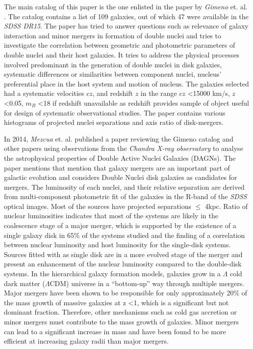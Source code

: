 \documentclass[12pt]{article}
\begin{document}
The main catalog of this paper is the one enlisted in the paper by \textit{Gimeno} et. al. \cite{gimeno}. The catalog contains a list of 109 galaxies, out of which 47 were available in the \textit{SDSS DR15}. The paper has tried to answer questions such as relevance of galaxy interaction and minor mergers in formation of double nuclei and tries to investigate the correlation between geometric and photometric parameters of double nuclei and their host galaxies. It tries to address the physical processes involved predominant in the generation of double nuclei in disk galaxies, systematic differences or similarities between component nuclei, nucleus’ preferential place in the host system and motion of nucleus. The galaxies selected had a systematic velocities $cz$, and redshift $z$ in the range $cz$ \textless 15000 km/s, $z$ \textless 0.05, $m_B$ \textless 18 if redshift unavailable as redshift provides sample of object useful for design of systematic observational studies. The paper contains various histograms of projected nuclei separations and axis ratio of disk-mergers.

\bigskip

In 2014, \textit{Mezcua} et. al. \cite{mezcua} published a paper reviewing the Gimeno catalog and other papers using observations from the \textit{Chandra X-ray observatory} to analyse the astrophysical properties of Double Active Nuclei Galaxies (DAGNs). The paper mentions that mention that galaxy mergers are an important part of galactic evolution and considers Double Nuclei disk galaxies as candidates for mergers. The luminosity of each nuclei, and their relative  separation are derived from multi-component photometric fit of the galaxies in the R-band of the \textit{SDSS} optical images. Most of the sources have projected separations $\leq$ 4kpc. Ratio of nuclear luminosities indicates that most of the systems are likely in the coalescence stage of a major merger, which is supported by the existence of a single galaxy disk in 65\% of the systems studied and the finding of a correlation between nuclear luminosity and host luminosity for the single-disk systems. Sources fitted with as single disk are in a more evolved stage of the merger and present an enhancement of the nuclear luminosity compared to the double-disk systems. In the hierarchical galaxy formation models, galaxies grow in a $\Lambda$ cold dark matter ($\Lambda$CDM) universe in a “bottom-up” way through multiple mergers. Major mergers have been shown to be responsible for only approximately 20\% of the mass growth of massive galaxies at z \textless 1, which is a significant but not dominant fraction. Therefore, other mechanisms such as cold gas accretion or minor mergers must contribute to the mass growth of galaxies. Minor mergers can lead to a significant increase in mass and have been found to be more efficient at increasing galaxy radii than major mergers.
\end{document}
